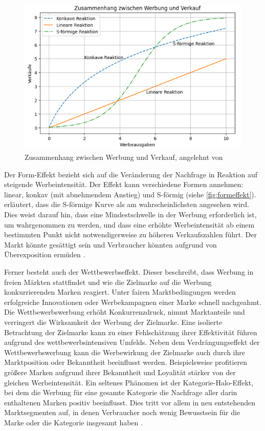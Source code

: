 \begin{figure}[H]
    \centering
    \includegraphics[width=0.75\linewidth]{images/formeffekt.png}
    \caption{Zusammenhang zwischen Werbung und Verkauf, angelehnt von \cite[1]{Pandey2021MMM}}
    \label{fig:formeffekt}
\end{figure}
\noindent
Der Form-Effekt bezieht sich auf die Veränderung der Nachfrage in Reaktion auf steigende Werbeintensität. Der Effekt kann verschiedene Formen annehmen: linear, konkav (mit abnehmendem Anstieg) und S-förmig (siehe \autoref{fig:formeffekt}). \cite{Pandey2021MMM} erläutert, dass die S-förmige Kurve als am wahrscheinlichsten angesehen wird. Dies weist darauf hin, dass eine Mindestschwelle in der Werbung erforderlich ist, um wahrgenommen zu werden, und dass eine erhöhte Werbeintensität ab einem bestimmten Punkt nicht notwendigerweise zu höheren Verkaufszahlen führt. Der Markt könnte gesättigt sein und Verbraucher könnten aufgrund von Überexposition ermüden \cite[786--787]{Pandey2021MMM}. \par
Ferner besteht auch der Wettbewerbseffekt. Dieser beschreibt, dass Werbung in freien Märkten stattfindet und wie die Zielmarke auf die Werbung konkurrierenden Marken reagiert. Unter fairen Marktbedingungen werden erfolgreiche Innovationen oder Werbekampagnen einer Marke schnell nachgeahmt. Die Wettbewerbswerbung erhöht Konkurrenzdruck, nimmt Marktanteile und verringert die Wirksamkeit der Werbung der Zielmarke. Eine isolierte Betrachtung der Zielmarke kann zu einer Fehlschätzung ihrer Effektivität führen aufgrund des wettbewerbsintensiven Umfelds. Neben dem Verdrängungseffekt der Wettbewerbswerbung kann die Werbewirkung der Zielmarke auch durch ihre Marktposition oder Bekanntheit beeinflusst werden. Beispielsweise profitieren größere Marken aufgrund ihrer Bekanntheit und Loyalität stärker von der gleichen Werbeintensität. Ein seltenes Phänomen ist der Kategorie-Halo-Effekt, bei dem die Werbung für eine gesamte Kategorie die Nachfrage aller darin enthaltenen Marken positiv beeinflusst. Dies tritt vor allem in neu entstehenden Marktsegmenten auf, in denen Verbraucher noch wenig Bewusstsein für die Marke oder die Kategorie insgesamt haben \cite[787]{Pandey2021MMM}.
